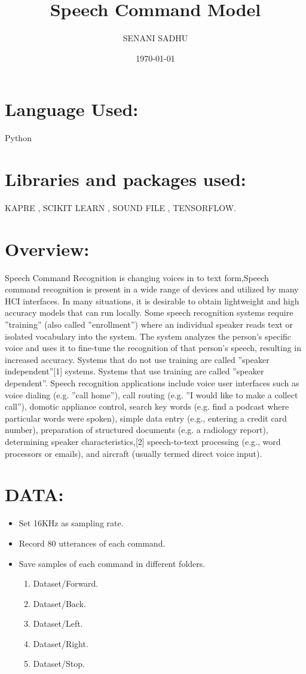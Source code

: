 \documentclass[a4paper,12pt]{article}
\title{Speech Command Model}
\author{SENANI SADHU}
\date{\today}
\begin{document}
	\maketitle
	\newpage
	\section{Language Used:}
	Python
	\section{Libraries and packages used:}
	KAPRE , SCIKIT LEARN , SOUND FILE , TENSORFLOW.
	\section{Overview:}
	Speech Command Recognition is changing voices in to text form,Speech
	command recognition is present in a wide range of devices and utilized
	by many HCI interfaces. In many situations, it is desirable to obtain
	lightweight and high accuracy models that can run locally.
	Some speech recognition systems require ”training” (also called ”enrollment”) where an individual speaker reads text or isolated vocabulary into
	the system. The system analyzes the person’s specific voice and uses it
	to fine-tune the recognition of that person’s speech, resulting in increased
	accuracy. Systems that do not use training are called ”speaker independent”[1] systems. Systems that use training are called ”speaker dependent”.
	Speech recognition applications include voice user interfaces such as voice
	dialing (e.g. ”call home”), call routing (e.g. ”I would like to make a
	collect call”), domotic appliance control, search key words (e.g. find a
	podcast where particular words were spoken), simple data entry (e.g., entering a credit card number), preparation of structured documents (e.g.
	a radiology report), determining speaker characteristics,[2] speech-to-text
	processing (e.g., word processors or emails), and aircraft (usually termed
	direct voice input).
	\section{DATA:}
	\begin{itemize}
		\item Set 16KHz as sampling rate.
		\item Record 80 utterances of each command.
		\item Save samples of each command in different folders.
		\begin{enumerate}
			\item Dataset/Forward.
			\item Dataset/Back.
			\item Dataset/Left.
			\item Dataset/Right.
			\item Dataset/Stop.
		\end{enumerate}
	\end{itemize}
\end{document}
